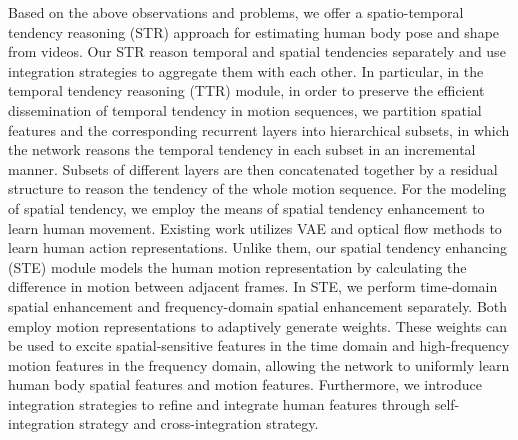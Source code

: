 \documentclass{bmvc2k}
\begin{document}
Based on the above observations and problems, we offer a spatio-temporal tendency reasoning (STR) approach for estimating human body pose and shape from videos. Our STR reason temporal and spatial tendencies separately and use integration strategies to aggregate them with each other. In particular, in the temporal tendency reasoning (TTR) module, in order to preserve the efficient dissemination of temporal tendency in motion sequences, we partition spatial features and the corresponding recurrent layers into hierarchical subsets, in which the network reasons the temporal tendency in each subset in an incremental manner.
Subsets of different layers are then concatenated together by a residual structure to reason the tendency of the whole motion sequence.
For the modeling of spatial tendency, we employ the means of spatial tendency enhancement to learn human movement. Existing work utilizes VAE \cite{yan2018mt, luo20203d} and optical flow methods \cite{zou2021eventhpe} to learn human action representations. Unlike them, our spatial tendency enhancing (STE) module models the human motion representation by calculating the difference in motion between adjacent frames. In STE, we perform time-domain spatial enhancement and frequency-domain spatial enhancement separately. Both employ motion representations to adaptively generate weights. These weights can be used to excite spatial-sensitive features in the time domain and high-frequency motion features in the frequency domain, allowing the network to uniformly learn human body spatial features and motion features. Furthermore, we introduce integration strategies to refine and integrate human features through self-integration strategy and cross-integration strategy.
\end{document}
